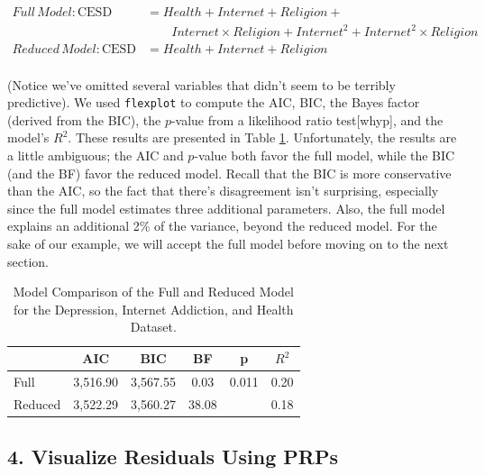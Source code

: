 \documentclass[
  man,floatsintext]{apa6}
\begin{document}
\begin{align}
\nonumber Full\,Model: \text{CESD}    &= Health + Internet + Religion + \\
\nonumber & \qquad Internet \times Religion + Internet^2 + Internet^2 \times Religion \\
\nonumber Reduced\,Model: \text{CESD} &= Health + Internet + Religion \\
\end{align}

(Notice we've omitted several variables that didn't seem to be terribly predictive). We used \texttt{flexplot} to compute the AIC, BIC, the Bayes factor (derived from the BIC), the \(p\)-value from a likelihood ratio test{[}whyp{]}, and the model's \(R^2\). These results are presented in Table \ref{tab:modelcomp}. Unfortunately, the results are a little ambiguous; the AIC and \(p\)-value both favor the full model, while the BIC (and the BF) favor the reduced model. Recall that the BIC is more conservative than the AIC, so the fact that there's disagreement isn't surprising, especially since the full model estimates three additional parameters. Also, the full model explains an additional 2\% of the variance, beyond the reduced model. For the sake of our example, we will accept the full model before moving on to the next section.

\begin{table}[tbp]

\begin{center}
\begin{threeparttable}

\caption{\label{tab:modelcomp}Model Comparison of the Full and Reduced Model for the Depression, Internet Addiction, and Health Dataset.}

\begin{tabular}{lccccc}
\toprule
 & AIC & BIC & BF & p & $R^2$\\
\midrule
Full & 3,516.90 & 3,567.55 & 0.03 & 0.011 & 0.20\\
Reduced & 3,522.29 & 3,560.27 & 38.08 &  & 0.18\\
\bottomrule
\end{tabular}

\end{threeparttable}
\end{center}

\end{table}

\subsection{4. Visualize Residuals Using PRPs}\label{visualize-residuals-using-prps-1}
\end{document}
